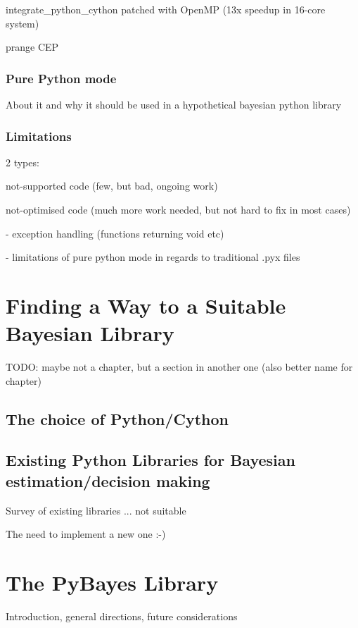 \documentclass[a4paper,12pt,oneside]{report}
\begin{document}
integrate\_python\_cython patched with OpenMP (13x speedup in 16-core system)

prange CEP

\subsection{Pure Python mode}

About it and why it should be used in a hypothetical bayesian python library

\subsection{Limitations}

2 types:

	not-supported code (few, but bad, ongoing work)

	not-optimised code (much more work needed, but not hard to fix in most cases)

		- exception handling (functions returning void etc)

		- limitations of pure python mode in regards to traditional .pyx files


\chapter{Finding a Way to a Suitable Bayesian Library}

TODO: maybe not a chapter, but a section in another one (also better name for chapter)

\section{The choice of Python/Cython}

\section{Existing Python Libraries for Bayesian estimation/decision making}

Survey of existing libraries ... not suitable

The need to implement a new one :-)


\chapter{The PyBayes Library}

Introduction, general directions, future considerations
\end{document}
